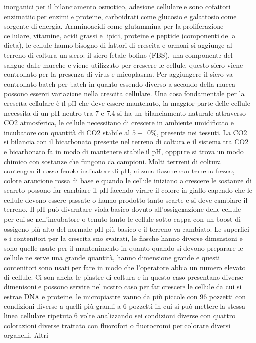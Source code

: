 inorganici per il bilanciamento osmotico, adesione cellulare e sono cofattori enzimatiic per enzimi e proteine, carboidrati come glucosio e galattosio come sorgente di energia. 
Amminoacidi come glutammina per la proliferazione cellulare, vitamine, acidi grassi e lipidi, proteine e peptide (componenti della dieta), le cellule hanno bisogno di fattori di crescita
e ormoni si aggiunge al terreno di coltura un siero: il siero fetale bofino (FBS), una componente del sangue dalle mucche e viene utilizzato per crescere le cellule, questo siero 
viene controllato per la presenza di virus e micoplasma. Per aggiungere il siero va controllato batch per batch in quanto essendo diverso a secondo della mucca possono esserci variazione
nella crescita cellulare. Una cosa fondamentale per la crescita cellulare \`e il pH che deve essere mantenuto, la maggior parte delle cellule necessita di un pH neutro tra 7 e 7.4 si
ha un bilanciamento naturale attraverso CO2 atmosferica, le cellule necessitano di crescere in ambiente umidificato e incubatore con quantit\`a di CO2 stabile al $5-10\%$, presente nei
tessuti. La CO2 si bilancia con il bicarbonato presente nel terreno di coltura e il sistema tra CO2 e bicarbonato fa in modo di mantenere stabile il pH, opppure si trova un modo chimico
con sostanze che fungono da campioni. Molti terrreni di coltura contengon il rosso fenolo indicatore di pH, ci sono fiasche con terreno fresco, colore arancione rossa di base e quando
le cellule iniziano a crescere le sostanze di scarrto possono far cambiare il pH facendo virare il colore in giallo capendo che le cellule devono essere passate o hanno prodotto tanto
scarto e si deve cambiare il terreno. Il pH pu\`o diverntare viola basico dovuto all'ossigenazione delle cellule per cui se nell'incubatore o tenuto tanto le cellule sotto cappa con un
boost di ossigeno pi\`u alto del normale pH pi\`u basico e il terreno va cambiato. Le superfici e i contenitori per la crescita sno svairati, le fiasche hanno diverse dimensioni e sono 
quelle usate per il mantenimento in quanto quando si devono preparare le cellule ne serve una grande quantit\`a, hanno dimensione grande e questi contenitori sono usati per fare in modo
che l'operatore abbia un numero elevato di cellule. Ci son anche le piastre di coltura e in questo caso presentano diverse dimenisoni e possono servire nel nostro caso per far crescere
le cellule da cui si estrae DNA e proteine, le micropiastre vanno da pi\`u piccole con 96 pozzetti con condizioni diverse a quelli pi\`u grandi a 6 pozzetti in cui si pu\`o mettere
la stessa linea cellulare ripetuta 6 volte analizzando sei condizioni diverse con quattro colorazioni diverse trattato con fluorofori o fluorocromi per colorare diversi organelli. Altri
